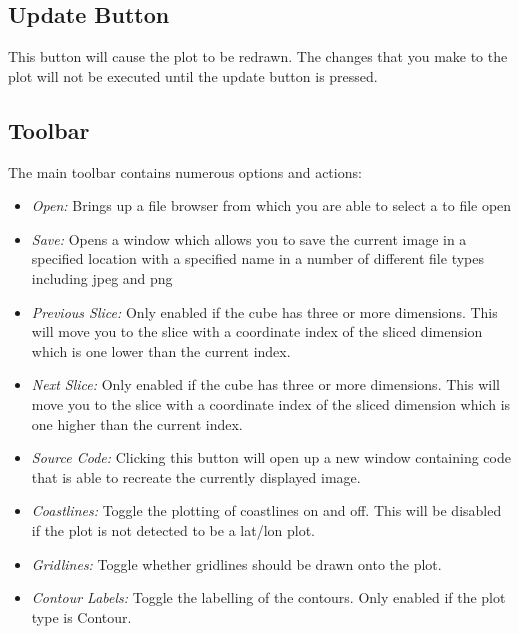 \documentclass[a4paper,12pt]{article}
\begin{document}
\subsection{Update Button}

This button will cause the plot to be redrawn. The changes that you make to
the plot will not be executed until the update button is pressed.

\subsection{Toolbar}

The main toolbar contains numerous options and actions:

\begin{itemize}

\item
\emph{Open:} Brings up a file browser from which you are able to select a to
file open

\item
\emph{Save:} Opens a window which allows you to save the current image in a
specified location with a specified name in a number of different file types
including jpeg and png

\item
\emph{Previous Slice:} Only enabled if the cube has three or more dimensions.
This will move you to the slice with a coordinate index of the sliced dimension
which is one lower than the current index.

\item
\emph{Next Slice:} Only enabled if the cube has three or more dimensions.
This will move you to the slice with a coordinate index of the sliced dimension
which is one higher than the current index.

\item
\emph{Source Code: } Clicking this button will open up a new window containing
code that is able to recreate the currently displayed image. 

\item
\emph{Coastlines:} Toggle the plotting of coastlines on and off. This will be
disabled if the plot is not detected to be a lat/lon plot.

\item
\emph{Gridlines:} Toggle whether gridlines should be drawn onto the plot.

\item
\emph{Contour Labels:} Toggle the labelling of the contours. Only enabled if
the plot type is Contour.


\end{itemize}
\end{document}
